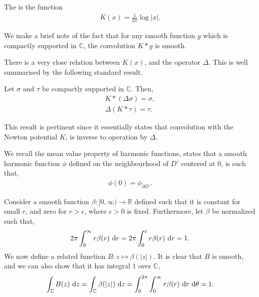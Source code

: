 \begin{definition}
	The  is the function
	\begin{align*}
		K(x) = \frac{1}{2 \pi}\log | x |.
	\end{align*}
\end{definition}

\begin{remark}
	We make a brief note of the fact that for any smooth function $ g $ which is
	compactly supported in $ \mathbb{C} $, the convolution $ K*g $ is smooth.
\end{remark}

There is a very close relation between $ K(x) $, and the operator $ \Delta $.
This is well summarised by the following standard result.

\begin{lemma}\label{lem:inverse-laplacian}
	Let $ \sigma $ and $ \tau $ be compactly supported in $ \mathbb{C} $. Then,
	\begin{gather*}
		K* ( \Delta \sigma ) = \sigma,\\
		\Delta ( K*\tau ) = \tau.
	\end{gather*}
\end{lemma}

\begin{remark}
	This result is pertinent since it essentially states that convolution with
	the Newton potential $ K $, is inverse to operation by $ \Delta $.
\end{remark}

We recall the mean value property of harmonic
functions, states that a smooth
harmonic function $ \phi $ defined on the neighbourhood of $ D' $ centered at $
	0 $, is such that,
\begin{align*}
	\phi ( 0 ) = \phi_{\partial D'}.
\end{align*}

Consider a smooth  function $ \beta:[0, \infty) \to \mathbb{R} $
defined such that it is constant for small $ r $, and zero for $ r > \epsilon $,
where $ \epsilon>0 $ is fixed. Furthermore, let $ \beta $ be normalized such
that,
\begin{align*}
	2 \pi\int_{0}^{\infty}{r \beta ( r )}\operatorname{\, d\!}{r} = 2 \pi\int_{0}^{\varepsilon}{r \beta
		( r )}\operatorname{\, d\!}{r} = 1.
\end{align*}
We now define a related function $ B:z \mapsto \beta ( | z | ) $. It is clear
that $ B $ is smooth, and we can also show that it has integral $ 1 $ over $
	\mathbb{C} $,
\begin{align*}
	\int_{\mathbb{C}}{B ( z )}\operatorname{\, d\!}{z} = \int_{\mathbb{C}}{\beta ( | z | )}\operatorname{\, d\!}{z} =
	\int_{0}^{2 \pi}{\int_{0}^{\infty}{r \beta ( r )}\operatorname{\, d\!}{r}}\operatorname{\, d\!}{\theta} = 1.
\end{align*}

